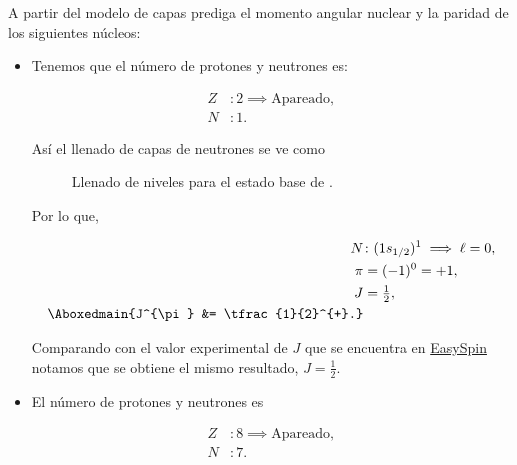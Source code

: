 \documentclass[./../main.tex]{subfiles}
\begin{document}
	\begin{exercise}
		A partir del modelo de capas prediga el momento angular nuclear y la paridad de los siguientes núcleos:

		\begin{itemize}
			\item {}
			
			\begin{solution}

				Tenemos que el número de protones y neutrones es:

				\begin{align*}
					Z &\colon 2 \implies \text{Apareado},\\
					N &\colon 1.
				\end{align*}

				Así el llenado de capas de neutrones se ve como
				
				\begin{figure}[htb]
                    \centering
                    
                    \caption{Llenado de niveles para el estado base de .}
                    \label{fig:FirstExcitedState3He}
                \end{figure}

				Por lo que,

				\begin{align*}
					N &\colon (1s_{1/2})^{1} \implies \ell = 0,\\
					\pi &= (-1)^{0} = +1,\\
					J &= \tfrac{1}{2},\\
					\Aboxedmain{J^{\pi} &= \tfrac{1}{2}^{+}.}
				\end{align*}

				Comparando con el valor experimental de \(J\) que se encuentra en \href{http://easyspin.org/documentation/isotopetable.html}{EasySpin} notamos que se obtiene el mismo resultado, \(J = \tfrac{1}{2}\).
			\end{solution}
			
			\pagebreak
                \item {}
			
			\begin{solution}
				El número de protones y neutrones es

				\begin{align*}
					Z &\colon 8 \implies \text{Apareado},\\
					N &\colon 7.
				\end{align*}


\end{solution}
\end{itemize}
\end{exercise}
\end{document}
